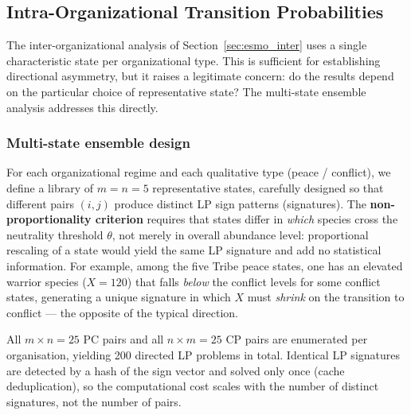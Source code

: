 \subsection{Intra-Organizational Transition Probabilities}
\label{sec:esmo_intra}

The inter-organizational analysis of Section~\ref{sec:esmo_inter} uses a
single characteristic state per organizational type.  This is sufficient for
establishing directional asymmetry, but it raises a legitimate concern: do
the results depend on the particular choice of representative state?  The
multi-state ensemble analysis addresses this directly.

\subsubsection*{Multi-state ensemble design}

For each organizational regime and each qualitative type (peace / conflict),
we define a library of $m = n = 5$ representative states, carefully designed
so that different pairs $(i, j)$ produce distinct LP sign patterns (signatures).
The \textbf{non-proportionality criterion} requires that states differ in
\emph{which} species cross the neutrality threshold $\theta$, not merely in
overall abundance level: proportional rescaling of a state would yield the
same LP signature and add no statistical information.  For example, among the
five Tribe peace states, one has an elevated warrior species ($X = 120$) that
falls \emph{below} the conflict levels for some conflict states, generating
a unique signature in which $X$ must \emph{shrink} on the transition to
conflict --- the opposite of the typical direction.

All $m \times n = 25$ PC pairs and all $n \times m = 25$ CP pairs are
enumerated per organisation, yielding 200 directed LP problems in total.
Identical LP signatures are detected by a hash of the sign vector and solved
only once (cache deduplication), so the computational cost scales with the
number of distinct signatures, not the number of pairs.

